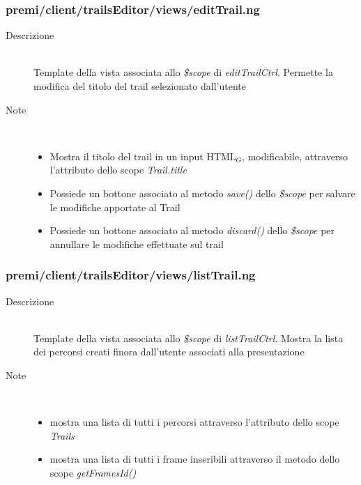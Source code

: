 \subsubsection{premi/client/trailsEditor/views/editTrail.ng}

\begin{description}
\item[Descrizione] \hfill \\
	Template della vista associata allo \textit{\$scope} di \textit{editTrailCtrl}. Permette la modifica del titolo del trail selezionato dall'utente
\item[Note] \hfill \\
	\begin{itemize}
			\item Mostra il titolo del trail in un input HTML$_G$, modificabile, attraverso l'attributo dello scope \textit{Trail.title}
			\item Possiede un bottone associato al metodo \textit{save()} dello \textit{\$scope} per salvare le modifiche apportate al Trail
			\item Possiede un bottone associato al metodo \textit{discard()} dello \textit{\$scope} per annullare le modifiche effettuate sul trail
	\end{itemize}
\end{description}


\subsubsection{premi/client/trailsEditor/views/listTrail.ng}

\begin{description}
\item[Descrizione] \hfill \\
	Template della vista associata allo \textit{\$scope} di \textit{listTrailCtrl}. Mostra la lista dei percorsi creati finora dall'utente associati alla presentazione
\item[Note] \hfill \\
	\begin{itemize}
			\item mostra una lista di tutti i percorsi attraverso l'attributo dello scope \textit{Trails}
			\item mostra una lista di tutti i frame inseribili attraverso il metodo dello scope \textit{getFramesId()}
	\end{itemize}
\end{description}

